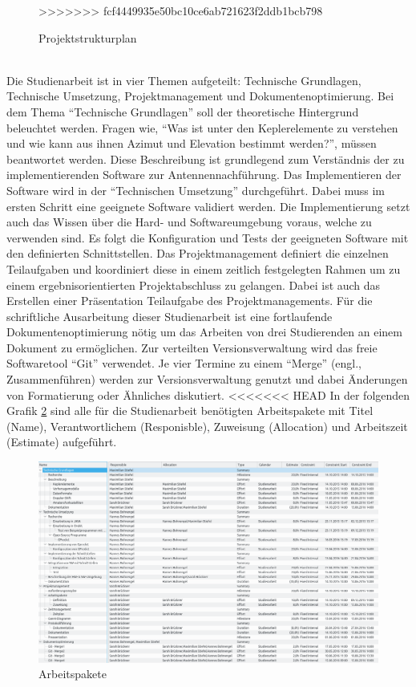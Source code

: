 \begin{figure}[h]
>>>>>>> fcf4449935e50bc10ce6ab721623f2ddb1bcb798
\caption{Projektstrukturplan}
 \label{fig:projektstruktur}
\end{figure}
\\
Die Studienarbeit ist in vier Themen aufgeteilt: Technische Grundlagen, Technische Umsetzung, 
Projektmanagement und Dokumentenoptimierung. Bei dem Thema ``Technische Grundlagen'' soll der 
theoretische Hintergrund beleuchtet werden. Fragen wie, ``Was ist unter den Keplerelemente zu 
verstehen und wie kann aus ihnen Azimut und Elevation bestimmt werden?'', müssen beantwortet 
werden. Diese Beschreibung ist grundlegend zum Verständnis der zu implementierenden Software 
zur Antennennachführung. Das Implementieren der Software wird in der ``Technischen Umsetzung'' 
durchgeführt. Dabei muss im ersten Schritt eine geeignete Software validiert werden. Die 
Implementierung setzt auch das Wissen über die Hard- und Softwareumgebung voraus, welche zu 
verwenden sind. Es folgt die Konfiguration und Tests der geeigneten Software mit den definierten 
Schnittstellen.
\newpar
Das Projektmanagement definiert die einzelnen Teilaufgaben und koordiniert diese in einem zeitlich 
festgelegten Rahmen um zu einem ergebnisorientierten Projektabschluss zu gelangen. Dabei ist auch 
das Erstellen einer Präsentation Teilaufgabe des Projektmanagements.
\newpar
Für die schriftliche Ausarbeitung dieser Studienarbeit ist eine fortlaufende Dokumentenoptimierung 
nötig um das Arbeiten von drei Studierenden an einem Dokument zu ermöglichen. Zur verteilten 
Versionsverwaltung wird das freie Softwaretool ``Git'' verwendet. Je vier Termine zu einem 
``Merge'' (engl., Zusammenführen) werden zur Versionsverwaltung genutzt und dabei Änderungen von 
Formatierung oder Ähnliches diskutiert.
\newpar
<<<<<<< HEAD
In der folgenden Grafik \ref{fig:arbeitspaket} sind alle für die Studienarbeit benötigten 
Arbeitspakete mit Titel (Name), Verantwortlichem (Responisble), Zuweisung (Allocation) und 
Arbeitszeit (Estimate) aufgeführt.
\begin{figure}[t]
 \centering
\includegraphics[width=1.0\linewidth]{./images/02depencies}
\caption{Arbeitspakete}
 \label{fig:arbeitspaket}
\end{figure}
